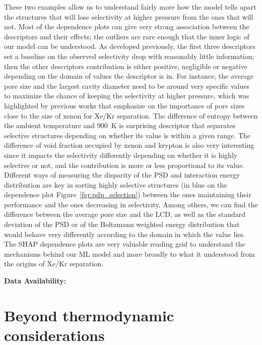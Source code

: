 \documentclass[main]{subfiles}
\begin{document}
These two examples allow us to understand fairly more how the model tells apart the structures that will lose selectivity at higher pressure from the ones that will not. Most of the dependence plots can give very strong association between the descriptors and their effects; the outliers are rare enough that the inner logic of our model can be understood. As developed previously, the first three descriptors set a baseline on the observed selectivity drop with reasonably little information; then the other descriptors contribution is either positive, negligible or negative depending on the domain of values the descriptor is in. For instance, the average pore size and the largest cavity diameter need to be around very specific values to maximize the chance of keeping the selectivity at higher pressure, which was highlighted by previous works that emphasize on the importance of pore sizes close to the size of xenon for Xe/Kr separation. The difference of entropy between the ambient temperature and \SI{900}{\kelvin} is surprising descriptor that separates selective structures depending on whether its value is within a given range. The difference of void fraction occupied by xenon and krypton is also very interesting since it impacts the selectivity differently depending on whether it is highly selective or not, and the contribution is more or less proportional to its value. Different ways of measuring the disparity of the PSD and interaction energy distribution are key in sorting highly selective structures (in blue on the dependence plot Figure~\ref{fgr:pdp_selection}) between the ones maintaining their performance and the ones decreasing in selectivity. Among others, we can find the difference between the average pore size and the LCD, as well as the standard deviation of the PSD or of the Boltzmann weighted energy distribution that would behave very differently according to the domain in which the value lies. The SHAP dependence plots are very valuable reading grid to understand the mechanisms behind our ML model and more broadly to what it understood from the origins of Xe/Kr separation.

\textbf{Data Availability:} \url{} 

\section{Beyond thermodynamic considerations}
\end{document}
